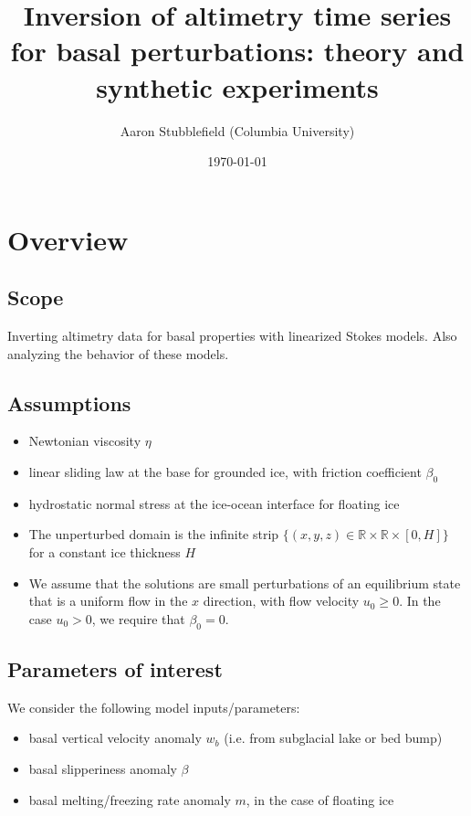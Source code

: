 \documentclass[paper=a4, fontsize=11pt]{article}
\title{
Inversion of altimetry time series for basal perturbations: theory
and synthetic experiments
}
\author{Aaron Stubblefield (Columbia University)} %
\date{\small\today} %
\begin{document}
\maketitle %

\section*{Overview}
\subsection*{Scope}
Inverting altimetry data for basal properties with linearized Stokes models.
Also analyzing the behavior of these models.

\subsection*{Assumptions}
\begin{itemize}
\item Newtonian viscosity $\eta$
\item linear sliding law at the base for grounded ice, with friction coefficient $\beta_0$
\item hydrostatic normal stress at the ice-ocean interface for floating ice
\item The unperturbed domain is the infinite strip $\{(x,y,z)\in\mathbb{R}\times\mathbb{R}\times[0,H]\}$ for a
constant ice thickness $H$
\item We assume that the solutions are small perturbations of an equilibrium state
that is a uniform flow in the $x$ direction, with flow velocity $u_0\geq 0$.
In the case $u_0>0$, we require that $\beta_0=0$.
\end{itemize}

\subsection*{Parameters of interest}
We consider the following model inputs/parameters:
\begin{itemize}
\item basal vertical velocity anomaly $w_b$ (i.e. from subglacial lake or bed bump)
\item basal slipperiness anomaly $\beta$
\item basal melting/freezing rate anomaly $m$, in the case of floating ice
\end{itemize}
\end{document}
